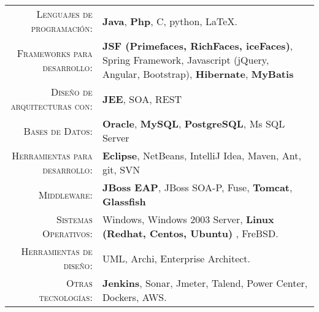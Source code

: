 %
%
%

\renewcommand{\arraystretch}{1.1}

	\begin{tabular}{>{}r>{}p{13cm}}
		\textsc{Lenguajes de programaci\'on:}  		&   \textbf{Java}, \textbf{Php}, C, python, \LaTeX. \\
		\textsc{Frameworks para desarrollo:}               	& \textbf{JSF (Primefaces, RichFaces, iceFaces)}, Spring Framework,
Javascript (jQuery, Angular, Bootstrap), \textbf{Hibernate}, \textbf{MyBatis}\\
		\textsc{Diseño de arquitecturas con:} 					& \textbf{JEE}, SOA, REST\\
		\textsc{Bases de Datos:}                  &   \textbf{Oracle}, \textbf{MySQL}, \textbf{PostgreSQL},  Ms SQL Server \\
		\textsc{Herramientas para desarrollo:}	  		&  \textbf {Eclipse}, NetBeans, IntelliJ Idea,  Maven, Ant, git, SVN \\
		\textsc{Middleware:}				        &   \textbf{JBoss EAP}, JBoss SOA-P, Fuse, \textbf{Tomcat}, \textbf{Glassfish}\\
		\textsc{Sistemas Operativos:}	        &   Windows, Windows 2003 Server, \textbf{Linux (Redhat, Centos, Ubuntu)} , FreBSD.\\
		\textsc{Herramientas de dise\~no:}				        &   UML, Archi, Enterprise Architect.\\
		\textsc{Otras tecnolog\'ias:}				        &   \textbf{Jenkins}, Sonar, Jmeter, Talend, Power Center, Dockers, AWS.\\
	\end{tabular}
